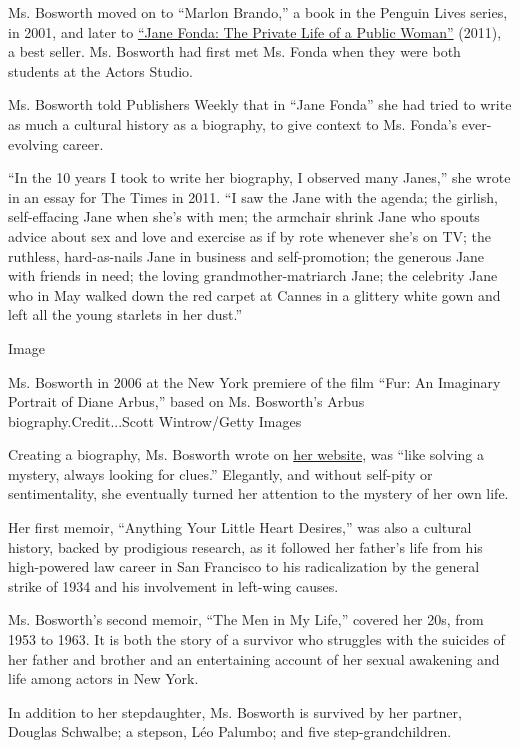Ms. Bosworth moved on to ``Marlon Brando,'' a book in the Penguin Lives
series, in 2001, and later to
\href{https://www.nytimes.com/2011/09/25/opinion/sunday/the-dark-tie-between-jane-fonda-and-her-biographer.html}{``Jane
Fonda: The Private Life of a Public Woman''} (2011), a best seller. Ms.
Bosworth had first met Ms. Fonda when they were both students at the
Actors Studio.

Ms. Bosworth told Publishers Weekly that in ``Jane Fonda'' she had tried
to write as much a cultural history as a biography, to give context to
Ms. Fonda's ever-evolving career.

``In the 10 years I took to write her biography, I observed many
Janes,'' she wrote in an essay for The Times in 2011. ``I saw the Jane
with the agenda; the girlish, self-effacing Jane when she's with men;
the armchair shrink Jane who spouts advice about sex and love and
exercise as if by rote whenever she's on TV; the ruthless, hard-as-nails
Jane in business and self-promotion; the generous Jane with friends in
need; the loving grandmother-matriarch Jane; the celebrity Jane who in
May walked down the red carpet at Cannes in a glittery white gown and
left all the young starlets in her dust.''

Image

Ms. Bosworth in 2006 at the New York premiere of the film ``Fur: An
Imaginary Portrait of Diane Arbus,'' based on Ms. Bosworth's Arbus
biography.Credit...Scott Wintrow/Getty Images

Creating a biography, Ms. Bosworth wrote on
\href{http://www.pbosworth.com/}{her website}, was ``like solving a
mystery, always looking for clues.'' Elegantly, and without self-pity or
sentimentality, she eventually turned her attention to the mystery of
her own life.

Her first memoir, ``Anything Your Little Heart Desires,'' was also a
cultural history, backed by prodigious research, as it followed her
father's life from his high-powered law career in San Francisco to his
radicalization by the general strike of 1934 and his involvement in
left-wing causes.

Ms. Bosworth's second memoir, ``The Men in My Life,'' covered her 20s,
from 1953 to 1963. It is both the story of a survivor who struggles with
the suicides of her father and brother and an entertaining account of
her sexual awakening and life among actors in New York.

In addition to her stepdaughter, Ms. Bosworth is survived by her
partner, Douglas Schwalbe; a stepson, Léo Palumbo; and five
step-grandchildren.

